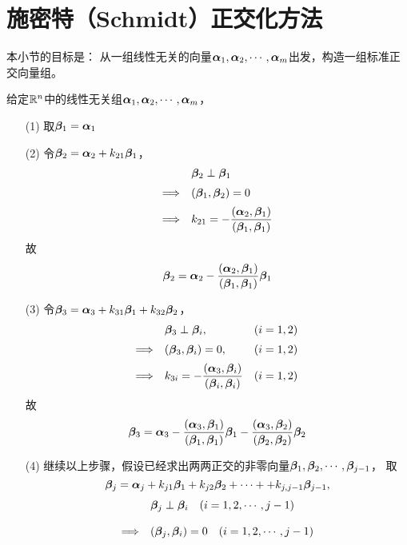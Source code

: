 \section{施密特（Schmidt）正交化方法}



本小节的目标是： 从一组线性无关的向量$\boldsymbol{\alpha}_1,\boldsymbol{\alpha}_2,\cdots,\boldsymbol{\alpha}_m$出发，构造一组标准正交向量组。







\begin{dingyi}
  给定$\R^n$中的线性无关组$\alphabd_1,\alphabd_2,\cd,\alphabd_m$， 
  \begin{itemize}
  \item[(1)] 取$\betabd_1=\alphabd_1$
  \item[(2)] 令$\betabd_2=\alphabd_2+k_{21}\betabd_1$，
    $$
    \begin{array}{rl}
      &\betabd_2\perp\betabd_1\\[0.2cm]
      \Longrightarrow&(\betabd_1,\betabd_2)=0\\[0.2cm] 
      \Longrightarrow& \ds k_{21}=-\frac{(\alphabd_2,\betabd_1)}{(\betabd_1,\betabd_1)} 
    \end{array}
    $$
    故
    $$
    \betabd_2=\alphabd_2-\frac{(\alphabd_2,\betabd_1)}{(\betabd_1,\betabd_1)}\betabd_1
    $$
  \item[(3)] 令$\betabd_3=\alphabd_3+k_{31}\betabd_1+k_{32}\betabd_2$，
    $$
    \begin{array}{rll}
      &\betabd_3\perp\betabd_i, & (i=1,2)\\[0.2cm] 
      \Longrightarrow&(\betabd_3,\betabd_i)=0, & (i=1,2)\\[0.2cm] 
      \Longrightarrow& \ds k_{3i}=-\frac{(\alphabd_3,\betabd_i)}{(\betabd_i,\betabd_i)} & (i=1,2) 
    \end{array}
    $$
    故
    $$
    \betabd_3=\alphabd_3-\frac{(\alphabd_3,\betabd_1)}{(\betabd_1,\betabd_1)}\betabd_1
    -\frac{(\alphabd_3,\betabd_2)}{(\betabd_2,\betabd_2)}\betabd_2
    $$
  \item[(4)] 继续以上步骤，假设已经求出两两正交的非零向量$\betabd_1,\betabd_2,\cd,\betabd_{j-1}$，
    取
    $$
    \betabd_j=\alphabd_j+k_{j1}\betabd_1+k_{j2}\betabd_2+\cd++k_{j,j-1}\betabd_{j-1},
    $$
    $$
    \begin{array}{rl}
      & \betabd_j \perp \betabd_i\quad (i=1,2,\cd,j-1)\\[0.4cm] 
      \Longrightarrow &(\betabd_j,\betabd_i)=0 \quad (i=1,2,\cd,j-1)\\[0.4cm] 

\end{array}$$
\end{itemize}
\end{dingyi}
